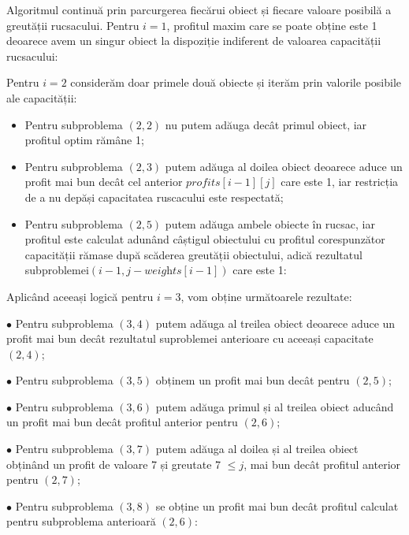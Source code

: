 \begin{sloppypar}
Algoritmul continuă prin parcurgerea fiecărui obiect și fiecare valoare posibilă a greutății rucsacului. Pentru $i = 1$, profitul maxim care se poate obține este 1 deoarece avem un singur obiect la dispoziție indiferent de valoarea capacității rucsacului: 


Pentru $i = 2$ considerăm doar primele două obiecte și iterăm prin valorile posibile ale capacității: \par
\begin{itemize}
\item Pentru subproblema $(2,2)$ nu putem adăuga decât primul obiect, iar profitul optim rămâne 1; 
\item Pentru subproblema $(2, 3)$ putem adăuga al doilea obiect deoarece aduce un profit mai bun decât cel anterior $\textit{profits}[i - 1][j]$ care este 1, iar restricția de a nu depăși capacitatea ruscacului este respectată; 
\item Pentru subproblema $(2, 5)$ putem adăuga ambele obiecte în rucsac, iar profitul este calculat adunând câștigul obiectului cu profitul corespunzător capacității rămase după scăderea greutății obiectului, adică rezultatul subproblemei$(i - 1, j - \textit{weights}[i - 1])$ care este 1: 
\end{itemize}


Aplicând aceeași logică pentru $i = 3$, vom obține următoarele rezultate: \par
$\bullet$ Pentru subproblema $(3, 4)$ putem adăuga al treilea obiect deoarece aduce un profit mai bun decât rezultatul suproblemei anterioare cu aceeași capacitate $(2, 4)$; \par
$\bullet$ Pentru subproblema $(3, 5)$ obținem un profit mai bun decât pentru $(2, 5)$; \par
$\bullet$ Pentru subproblema $(3, 6)$ putem adăuga primul și al treilea obiect aducând un profit mai bun decât profitul anterior pentru $(2, 6)$; \par
$\bullet$ Pentru subproblema $(3, 7)$ putem adăuga al doilea și al treilea obiect obținând un profit de valoare 7 și greutate 7 $ \le j$, mai bun decât profitul anterior pentru $(2, 7)$; \par
$\bullet$ Pentru subproblema $(3, 8)$ se obține un profit mai bun decât profitul calculat pentru subproblema anterioară $(2, 6)$: \par


\end{sloppypar}
